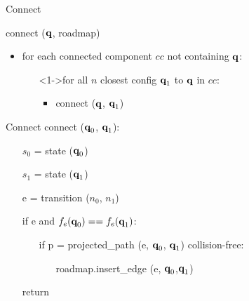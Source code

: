 %
%

\begin {frame} {Connect}

  \begin{block}{connect ($\textbf{q}$, roadmap)}
    \begin{itemize}
    \item <1-> for each connected component $cc$ not containing $\textbf{q}$:
        \begin{itemize}
        \item []<1->for all $n$ closest config $\textbf{q}_1$ to $\textbf{q}$ in $cc$:
          \begin{itemize}
          \item connect ($\textbf{q}$, $\textbf{q}_1$)
          \end{itemize}
        \end{itemize}
    \end{itemize}
  \end{block}
\end {frame}

%
%

\begin {frame} {Connect}
connect ($\textbf{q}_0$, $\textbf{q}_1$):
\begin{itemize}
  \item [] $s_0$ = state ($\textbf{q}_0$)
  \item [] $s_1$ = state ($\textbf{q}_1$)
  \item [] e = transition ($n_0$, $n_1$)
  \item [] if e and $f_{e} (\textbf{q}_0) == f_{e} (\textbf{q}_1)$:
    \begin {itemize}
    \item [] if p = projected\_path (e, $\textbf{q}_0$, $\textbf{q}_1$) collision-free:
      \begin {itemize}
        \item [] roadmap.insert\_edge (e, $\textbf{q}_0$,$\textbf{q}_1$)
      \end {itemize}
    \end {itemize}
  \item [] return
\end{itemize}

\end {frame}

%
%


